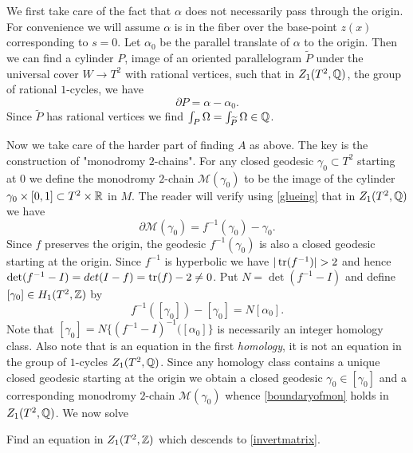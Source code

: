 We first take care of the fact that $\alpha$ does not necessarily
pass through the origin. For convenience we will assume $\alpha$
is in the fiber over the base-point $z(x)$ corresponding to $s=0$.
Let $\alpha_0$ be the parallel translate of $\alpha$ to the origin.
Then we can find a cylinder $P$, image of an oriented parallelogram
$\widetilde{P}$ under the universal cover $W \to T^2$ with rational
vertices, such that in $Z_1(T^2,\mathbb{Q})$, the group of rational $1$-cycles,
we have
\begin{equation}\label{firstrectangle}
\partial P = \alpha - \alpha_0.
\end{equation}
Since $\widetilde{P}$ has rational vertices we find $\int_{P} \Omega
= \int_{\widetilde{P}} \Omega \in \mathbb{Q}$.

Now we take care of the harder part of finding $A$ as above. The
key is the construction  of "monodromy $2$-chains".  For any closed
geodesic $\gamma_0 \subset T^2$ starting at $0$ we define the
monodromy $2$-chain  $\mathcal{M}(\gamma_0)$ to be the image of the
cylinder $\gamma_0 \times [0,1] \subset T^2 \times \mathbb{R}$ in $M$.
The reader will verify using \eqref{glueing} that in $Z_1(T^2,\mathbb{Q})$ we have 
\begin{equation} \label{boundaryofmon}
 \partial \mathcal{M}(\gamma_0) = f^{-1}(\gamma_0) -\gamma_0.
\end{equation}
Since $f$ preserves the origin, the geodesic $f^{-1}(\gamma_0)$ is
also a closed geodesic starting at the origin. Since $f^{-1}$ is
hyperbolic we have $|\operatorname{tr}(f^{-1})| >2$ and hence $\det(f^{-1} -I)=
det( I - f) = \operatorname{tr}(f) -2 \neq 0$. Put $N= \det(f^{-1} -I)$ and define
$[\gamma_0] \in H_1(T^2,\mathbb{Z})$ by
\begin{equation}\label{invertmatrix}
f^{-1}([\gamma_0]) -[\gamma_0] = N[\alpha_0]. 
\end{equation}
Note that $[\gamma_0] = N \{(f^{-1} - I)^{-1} ([\alpha_0] \}$ is
necessarily an integer homology class. Also note that is an equation
in the first {\it homology}, it is not an equation in the group of
$1$-cycles $Z_1(T^2,\mathbb{Q})$. Since any homology class contains a unique
closed geodesic starting at the origin we obtain a closed geodesic
$\gamma_0 \in [\gamma_0]$  and a corresponding  monodromy $2$-chain
$\mathcal{M}(\gamma_0)$ whence \eqref{boundaryofmon} holds in
$Z_1(T^2,\mathbb{Q})$. We now solve

\begin{problem}
Find an equation in $Z_1(T^2,\mathbb{Z})$ which descends to  \eqref{invertmatrix}. 
\end{problem}
